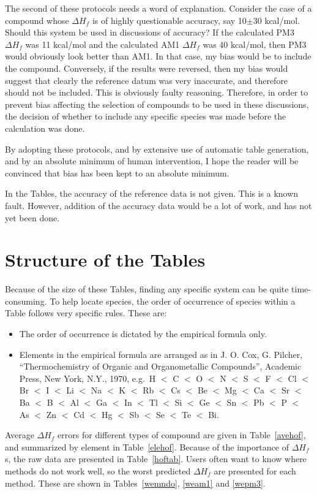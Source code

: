 The second of these protocols needs a word of explanation.  Consider the case
of a compound whose $\Delta H_f$ is of highly questionable accuracy, say 
10$\pm$30 kcal/mol.  Should this system be used in discussions of accuracy? If
the calculated PM3 $\Delta H_f$ was 11 kcal/mol and the calculated AM1 $\Delta
H_f$ was 40 kcal/mol, then PM3 would obviously look better than AM1.  In that
case, my bias would be to include the compound.  Conversely, if the results
were reversed, then my bias would suggest that clearly the reference datum was
very inaccurate,  and therefore should not be included.  This is obviously
faulty reasoning.  Therefore, in order to prevent bias affecting the selection
of compounds to be used in these discussions, the decision of whether to
include any specific species was made before the calculation was done.

By adopting these protocols, and by extensive use of automatic table
generation, and by an absolute minimum  of human intervention, I hope the
reader will be convinced that bias has been kept to an absolute minimum.

In the Tables, the accuracy of the reference data is not given.  This is a
known fault. However, addition of the accuracy data would be a lot of work,
and  has not yet been done.  

\section{Structure of the Tables}
Because of the size of these Tables, finding any specific system can be quite
time-consuming.  To help locate species, the order of occurrence of species
within a Table follows very specific rules.  These are:

\begin{itemize}
\item The order of occurrence is dictated by the empirical formula only.
\item Elements in the empirical formula are arranged as in 
J. O. Cox, G. Pilcher, ``Thermochemistry of Organic and Organometallic
Compounds'', Academic Press, New York, N.Y., 1970, e.g.\
H $<$ C $<$ O $<$ N $<$ S $<$ F $<$ Cl $<$ Br $<$ I $<$ Li $<$ Na $<$ K $<$ 
Rb $<$ Cs $<$ Be $<$ Mg $<$ Ca $<$ Sr $<$ Ba $<$ B $<$ Al $<$ Ga $<$ In $<$ 
Tl $<$ Si $<$ Ge $<$ Sn $<$ Pb $<$ P $<$ As $<$ Zn $<$ Cd $<$ Hg $<$ Sb $<$
Se $<$ Te $<$ Bi.
\end{itemize}
 
Average $\Delta H_f$ errors for different types of compound are given  in
Table~\ref{avehof}, and summarized by element in Table~\ref{elehof}. Because of
the importance of $\Delta H_f$s, the raw data are presented in
Table~\ref{hoftab}.  Users often want to know where methods do not work well,
so the worst predicted $\Delta H_f$ are presented for each method.  These are
shown in Tables~\ref{wemndo}, \ref{weam1} and \ref{wepm3}.

